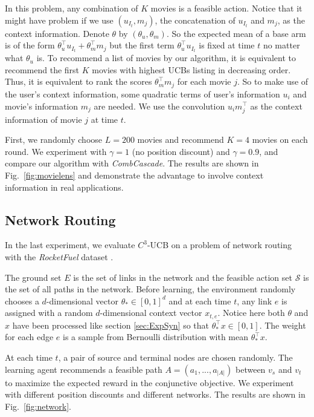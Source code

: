 \documentclass{article}
\newcommand{\cS}{\mathcal{S}}
\begin{document}
In this problem, any combination of $K$ movies is a feasible action. Notice that it might have problem if we use $(u_{I_t}, m_j)$, the concatenation of $u_{I_t}$ and $m_j$, as the context information. Denote $\theta$ by $(\theta_u, \theta_m)$. So the expected mean of a base arm is of the form $\theta_u^{\top} u_{I_t} + \theta_m^{\top} m_j$ but the first term $\theta_u^{\top} u_{I_t}$ is fixed at time $t$ no matter what $\theta_u$ is. To recommend a list of movies by our algorithm, it is equivalent to recommend the first $K$ movies with highest UCBs listing in decreasing order. Thus, it is equivalent to rank the scores $\theta_m^{\top} m_j$ for each movie $j$. So to make use of the user's context information, some quadratic terms of user's information $u_i$ and movie's information $m_j$ are needed. We use the convolution $u_{i}m_j^{\top}$ as the context information of movie $j$ at time $t$.

First, we randomly choose $L=200$ movies and recommend $K=4$ movies on each round. We experiment with $\gamma=1$ (no position discount) and $\gamma=0.9$, and compare our algorithm with {\it CombCascade}. The results are shown in Fig.~\ref{fig:movielens} and demonstrate the advantage to involve context information in real applications.

\subsection{Network Routing}

In the last experiment, we evaluate $C^3$-UCB on a problem of network routing with the {\it RocketFuel} dataset \cite{spring2004measuring}.

The ground set $E$ is the set of links in the network and the feasible action set $\cS$ is the set of all paths in the network. Before learning, the environment randomly chooses a $d$-dimensional vector $\theta_* \in [0,1]^d$ and at each time $t$, any link $e$ is assigned with a random $d$-dimensional context vector $x_{t,e}$. Notice here both $\theta$ and $x$ have been processed like section \ref{sec:ExpSyn} so that $\theta_*^{\top}x \in [0,1]$. The weight for each edge $e$ is a sample from Bernoulli distribution with mean $\theta_*^{\top}x$.

At each time $t$, a pair of source and terminal nodes are chosen randomly. The learning agent recommends a feasible path $A = (a_1,...,a_{|A|})$ between $v_s$ and $v_t$ to maximize the expected reward in the conjunctive objective. We experiment with different position discounts and different networks. The results are shown in Fig.~\ref{fig:network}. 
\end{document}
